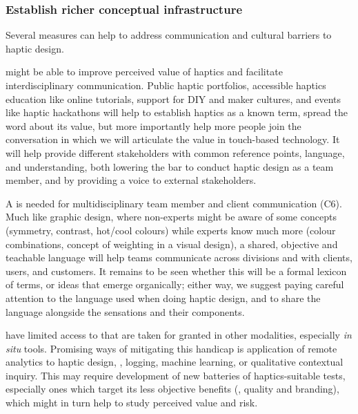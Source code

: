     
\subsubsection{Establish richer conceptual infrastructure}
\noindent
Several measures can help to address communication and cultural barriers to haptic design. %

     might be able to improve perceived value of haptics and facilitate interdisciplinary communication. %
    Public haptic portfolios, accessible haptics education \citep{Jones2014} like online tutorials, support for DIY and maker cultures, and events like haptic hackathons \citep{madelska2015news} will help to establish haptics as a known term, spread the word about its value, but more importantly help more people join the conversation in which we will articulate %
    the value in touch-based technology.
    It will help provide different stakeholders with common reference points, language, and understanding, both lowering the bar to conduct haptic design as a team member, and by providing a voice to external stakeholders.
    
    
    A  is needed for multidisciplinary team member and client communication (C6).
    Much like graphic design, where non-experts might be aware of some concepts (symmetry, contrast, hot/cool colours) 
    while experts know much more (colour combinations, concept of weighting in a visual design), 
    a shared, objective and teachable language will help teams communicate across divisions and with clients, users, and customers.
    It remains to be seen whether this will be a formal lexicon of terms, or ideas that emerge organically; either way, we suggest paying careful attention to the language used when doing haptic design, and to share the language alongside the sensations and their components.
    
    
     have limited access to  that are taken for granted in other modalities, especially \emph{in situ} tools.
    Promising ways of mitigating this handicap is application of remote analytics to haptic design, \eg, logging, machine learning, or qualitative contextual inquiry.
    This may require development of new batteries of haptics-suitable tests, especially ones which target its less objective benefits (\eg, quality and branding), which might in turn help to study perceived value and risk.


